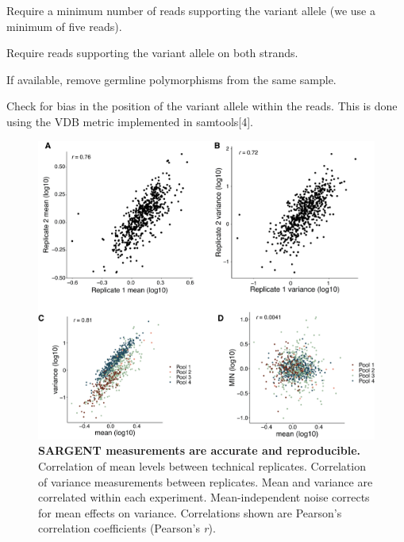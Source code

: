     Require a minimum number of reads supporting the variant allele (we use a minimum of five reads).

    Require reads supporting the variant allele on both strands.

    If available, remove germline polymorphisms from the same sample.

    Check for bias in the position of the variant allele within the reads. This is done using the VDB metric implemented in samtools[4].

\begin{figure}[t!]  
    \centering
    \includegraphics[width=\linewidth]{figures/cas/cas_figure2.png}
    \caption[SARGENT measurements are accurate and reproducible.]{%
        \textbf{SARGENT measurements are accurate and reproducible.}
        Correlation of mean levels between technical replicates.
        Correlation of variance measurements between replicates.
        Mean and variance are correlated within each experiment.
        Mean-independent noise corrects for mean effects on variance. Correlations shown are Pearson’s correlation coefficients (Pearson’s \textit{r}). 
    }
    \label{fig:cas_figure2}
\end{figure}


